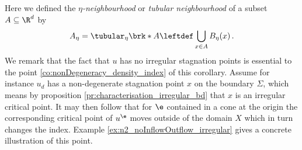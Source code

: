 Here we defined the \emph{$\eta$-neighbourhood} or \emph{tubular neighbourhood}
of a subset $A\subseteq\R^d$ by
\begin{align}
  A_\eta=\tubular_\eta\brk*{A}\leftdef\bigcup_{x\in A}B_\eta(x)\label{eq:def_tubularNbh}\,.
\end{align}
We remark that the fact that $u$ has no irregular stagnation points is essential to the point 
\ref{co:nonDegeneracy_density_index} of this corollary. 
Assume for instance $u_d$ has a non-degenerate stagnation point $x$ on the boundary $\Sigma$, 
which means by proposition \ref{pr:characterisation_irregular_bd} that $x$ is an irregular critical point. 
It may then follow that for $\e$ contained in a cone 
at the origin the corresponding critical point of
$u^\e$ moves outside of the domain $X$ which in turn changes the index.
Example \ref{ex:n2_noInflowOutflow_irregular} gives a concrete illustration of this point.
